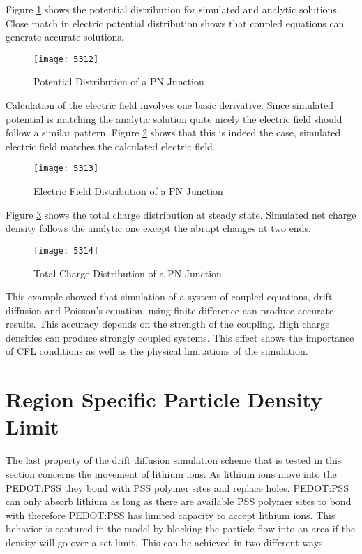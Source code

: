 \begin{doublespace}
 Figure \ref{pnpot} shows the potential distribution for simulated and analytic solutions. Close match in electric potential distribution shows that coupled equations can generate accurate solutions.
 
\begin{figure}[!htp]
\centering
\texttt{[image: 5312]}
\caption{Potential Distribution of a PN Junction} 
\label{pnpot}
\end{figure}

Calculation of the electric field involves one basic derivative. Since simulated potential is matching the analytic solution quite nicely the electric field should follow a similar pattern. Figure \ref{pnefield} shows that this is indeed the case, simulated electric field matches the calculated electric field.
\begin{figure}[!htp]
\centering
\texttt{[image: 5313]}
\caption{Electric Field Distribution of a PN Junction} 
\label{pnefield}
\end{figure}

Figure \ref{pncd} shows the total charge distribution at steady state. Simulated net charge density follows the analytic one except the abrupt changes at two ends. 
\begin{figure}
\centering
\texttt{[image: 5314]}
\caption{Total Charge Distribution of a PN Junction} 
\label{pncd}
\end{figure}

This example showed that simulation of a system of coupled equations, drift diffusion and Poisson's equation, using finite difference can produce accurate results. This accuracy depends on the strength of the coupling. High charge densities can produce strongly coupled systems. This effect shows the importance of CFL conditions as well as the physical limitations of the simulation.


\clearpage
\section{Region Specific Particle Density Limit}

The last property of the drift diffusion simulation scheme that is tested in this section concerns the movement of lithium ions. As lithium ions move into the PEDOT:PSS they bond with PSS polymer sites and replace holes. PEDOT:PSS can only absorb lithium as long as there are available PSS polymer sites to bond with therefore PEDOT:PSS has limited capacity to accept lithium ions. This behavior is captured in the model by blocking the particle flow into an area if the density will go over a set limit. This can be achieved in two different ways. 


\end{doublespace}
